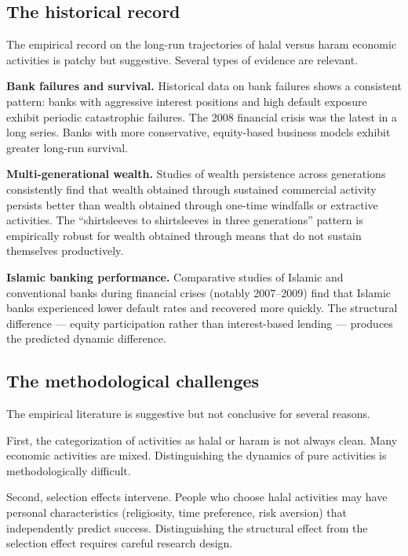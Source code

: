 \subsection{The historical record}

The empirical record on the long-run trajectories of halal versus
haram economic activities is patchy but suggestive. Several types
of evidence are relevant.

\textbf{Bank failures and survival.} Historical data on bank
failures shows a consistent pattern: banks with aggressive interest
positions and high default exposure exhibit periodic catastrophic
failures. The 2008 financial crisis was the latest in a long
series. Banks with more conservative, equity-based business models
exhibit greater long-run survival.

\textbf{Multi-generational wealth.} Studies of wealth persistence
across generations consistently find that wealth obtained through
sustained commercial activity persists better than wealth obtained
through one-time windfalls or extractive activities. The
``shirtsleeves to shirtsleeves in three generations'' pattern is
empirically robust for wealth obtained through means that do not
sustain themselves productively.

\textbf{Islamic banking performance.} Comparative studies of
Islamic and conventional banks during financial crises (notably
2007--2009) find that Islamic banks experienced lower default rates
and recovered more quickly. The structural difference --- equity
participation rather than interest-based lending --- produces the
predicted dynamic difference.

\subsection{The methodological challenges}

The empirical literature is suggestive but not conclusive for
several reasons.

First, the categorization of activities as halal or haram is not
always clean. Many economic activities are mixed. Distinguishing
the dynamics of pure activities is methodologically difficult.

Second, selection effects intervene. People who choose halal
activities may have personal characteristics (religiosity, time
preference, risk aversion) that independently predict success.
Distinguishing the structural effect from the selection effect
requires careful research design.

